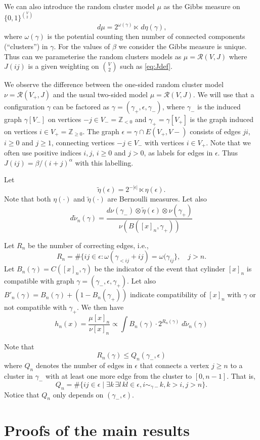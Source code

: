 \documentclass[11pt, a4paper]{amsart}
\theoremstyle{definition}
\theoremstyle{remark}
\renewcommand{\d}{\,d}
\providecommand{\ZZ}{\mathbb{Z}}
\providecommand{\mscr}{\mathscr}
\providecommand{\e}{\epsilon}
\providecommand{\g}{\gamma}
\providecommand{\w}{\omega}
\begin{document}
We can also introduce the random cluster model $\mu$ as the Gibbs measure on
$\{0,1\}^{\binom V2}$
$$ \d\mu = 2^{\w(\g)} \ltimes \d\eta(\g), $$
where $\w(\g)$ is the potential counting then number of connected components
(``clusters'') in $\g$. For the values of $\beta$ we consider the Gibbs measure
is unique. Thus can we parameterise the random clusters models as
$\mu = \mscr R(V,J)$ where $J(ij)$ is a given weighting on $\binom V2$ such as
\eqref{eq:Jdef}.

We observe the difference between the one-sided random cluster model
$\nu = \mscr R(V_+,J)$ and the usual two-sided model $\mu = \mscr R(V,J)$. We
will use that a configuration $\g$ can be factored as $\g = (\g_+, \e, \g_-)$,
where $\g_-$ is the induced graph $\g[V_-]$ on vertices $-j\in V_-=\ZZ_{<0}$ and
$\g_+=\g[V_+]$ is the graph induced on vertices $i\in V_+=\ZZ_{\ge0}$. The graph
$\e=\g\cap E(V_+,V-)$ consists of edges $ji$, $i\ge0$ and $j\ge 1$, connecting
vertices $-j\in V_-$ with vertices $i\in V_+$. Note that we often use positive
indices $i,j$, $i\ge0$ and $j>0$, as labels for edges in $\e$. Thus
$J(ij)=\beta/(i+j)^\alpha$ with this labelling.

Let
$$
\tilde \eta(\epsilon)= 2^{-|\epsilon|} \ltimes \eta (\epsilon).
$$
Note that both $\eta(\cdot)$ and $\tilde\eta (\cdot)$ are Bernoulli measures.
Let also
$$
d\tilde \nu_n(\gamma) = \frac{d\nu(\gamma_-)\otimes \tilde \eta(\epsilon)\otimes \nu(\gamma_+)}{\nu(B([x]_n,\gamma_+))}
$$

Let $R_n$ be the number of correcting edges, i.e.,
$$
R_n=\# \{ij\in \epsilon: \omega (\gamma_{< ij}+ij)=\omega (\gamma_{ij}\},\quad j>n.
$$
Let $B_n(\g)=C([x]_n,\gamma)$ be the indicator of the event that cylinder
$[x]_n$ is compatible with graph $\g=(\g_-,\e,\g_+)$. Let also
$B'_n(\g) = B_n(\g) + (1-B_n(\g_+))$ indicate compatibility of $[x]_n$ with $\g$
or not compatible with $\g_+$. We then have
\[
  h_n(x) = \frac{\mu [x]_n}{\nu [x]_n}\propto \int B_n(\g) \cdot 2^{R_n(\g)} \; d\tilde \nu_n (\gamma)
\]

Note that
$$ R_n(\g) \le Q_n(\g_-,\e) $$
where $Q_n$ denotes the number of edges in $\e$ that connects a vertex $j\ge n$
to a cluster in $\g_-$ with at least one more edge from the cluster to
$[0,n-1]$. That is,
$$  Q_n=\# \{ij \in \epsilon \mid  \exists k\, \exists l\, kl\in\e,  i \sim_{\gamma-} k, k>i, j > n\}.$$
Notice that $Q_n$ only depends on $(\gamma_-,\epsilon)$.



\section{Proofs of the main results}\noindent
\end{document}
